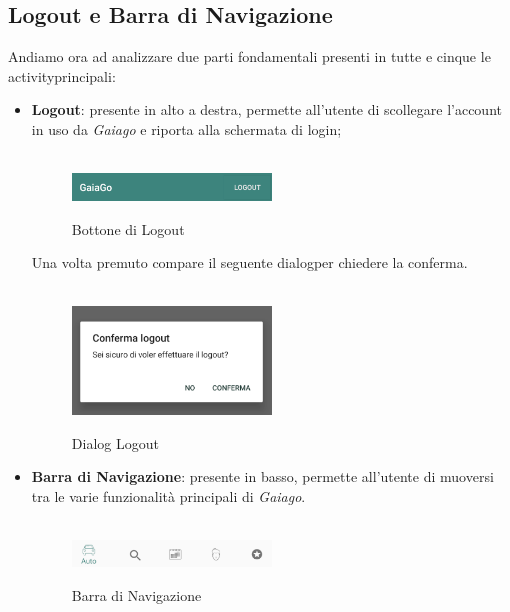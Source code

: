 \subsection{Logout e Barra di Navigazione}
Andiamo ora ad analizzare due parti fondamentali presenti in tutte e cinque le activity\glosp principali:
\begin{itemize}
	\item \textbf{Logout}: presente in alto a destra, permette all'utente di scollegare l'account in uso da \textit{Gaiago} e riporta alla schermata di login;
	\\\\
	  \begin{figure}[H] 
	 	\centering 
	 	\includegraphics[width=0.5\textwidth]{res/images/logout.png}\\
	 	\caption{Bottone di Logout}
	 	\label{Login button}
	 \end{figure}
 Una volta premuto compare il seguente dialog\glosp per chiedere la conferma.
 \\\\
 \begin{figure}[H] 
 	\centering 
 	\includegraphics[width=0.5\textwidth]{res/images/logout_press.png}\\
 	\caption{Dialog Logout}
 	\label{Logout_press}
 \end{figure}
 	\item  \textbf{Barra di Navigazione}: presente in basso, permette all'utente di muoversi tra le varie funzionalità principali di \textit{Gaiago}.
 	\\\\
 	  \begin{figure}[H] 
 	  	\centering 
 	  	\includegraphics[width=0.5\textwidth]{res/images/barra_navigazione.png}\\
 	  	\caption{Barra di Navigazione}
 	  	\label{Barra di navigazione}
 	  \end{figure}
\end{itemize}
\pagebreak

